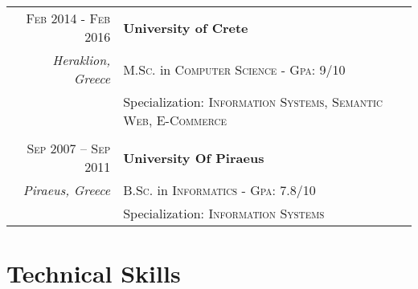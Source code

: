 \documentclass[11pt]{article}
\begin{document}
\begin{longtable}{r|p{12.5cm}}

\textsc{Feb 2014 - Feb 2016} & \textbf{University of Crete} \\
\footnotesize{\textit{Heraklion, Greece}} & \textsc{M.Sc.} in \textsc{Computer Science} - \textsc{Gpa}: 9/10\\
& Specialization: \textsc{Information Systems, Semantic Web, E-Commerce} \\

\multicolumn{2}{c}{} \\
\textsc{Sep 2007 – Sep 2011} & \textbf{University Of Piraeus} \\
\footnotesize{\textit{Piraeus, Greece}} & \textsc{B.Sc.} in \textsc{Informatics} - \textsc{Gpa}: 7.8/10 \\
& Specialization: \textsc{Information Systems} \\

\end{longtable}

\section{Technical Skills}
\end{document}
